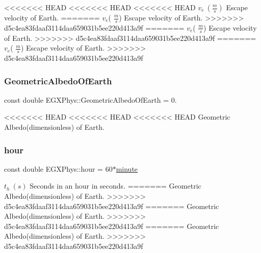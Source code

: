<<<<<<< HEAD
<<<<<<< HEAD
<<<<<<< HEAD
$v_e\ (\frac{m}{s})$ Escape velocity of Earth. \mbox{\label{namespace_e_g_x_phys_aae01fb8ed365fc5de7acebeef34b7351}} 
=======
$v_e$( $\frac{m}{s}$) Escape velocity of Earth. \mbox{\label{namespace_e_g_x_phys_aae01fb8ed365fc5de7acebeef34b7351}} 
>>>>>>> d5c4ea83fdaaf3114daa659031b5ee220d413a9f
=======
$v_e$( $\frac{m}{s}$) Escape velocity of Earth. \mbox{\label{namespace_e_g_x_phys_aae01fb8ed365fc5de7acebeef34b7351}} 
>>>>>>> d5c4ea83fdaaf3114daa659031b5ee220d413a9f
=======
$v_e$( $\frac{m}{s}$) Escape velocity of Earth. \mbox{\label{namespace_e_g_x_phys_aae01fb8ed365fc5de7acebeef34b7351}} 
>>>>>>> d5c4ea83fdaaf3114daa659031b5ee220d413a9f
\subsubsection{\texorpdfstring{Geometric\+Albedo\+Of\+Earth}{GeometricAlbedoOfEarth}}
{\footnotesize\ttfamily const double E\+G\+X\+Phys\+::\+Geometric\+Albedo\+Of\+Earth = 0.}

<<<<<<< HEAD
<<<<<<< HEAD
<<<<<<< HEAD
Geometric Albedo(dimensionless) of Earth. \mbox{\label{namespace_e_g_x_phys_a85c64ea70cddbb7e4c96adcc01cef6e2}} 
\subsubsection{\texorpdfstring{hour}{hour}}
{\footnotesize\ttfamily const double E\+G\+X\+Phys\+::hour = 60$\ast$\hyperlink{namespace_e_g_x_phys_ab3a72a63e9c502847d0db88a167dc02b}{minute}}

$t_{h}\ (s)$ Seconds in an hour in seconds. \mbox{\label{namespace_e_g_x_phys_ace4a9d8c0b21215536857f4c1087a4e8}} 
=======
Geometric Albedo(dimensionless) of Earth. \mbox{\label{namespace_e_g_x_phys_ace4a9d8c0b21215536857f4c1087a4e8}} 
>>>>>>> d5c4ea83fdaaf3114daa659031b5ee220d413a9f
=======
Geometric Albedo(dimensionless) of Earth. \mbox{\label{namespace_e_g_x_phys_ace4a9d8c0b21215536857f4c1087a4e8}} 
>>>>>>> d5c4ea83fdaaf3114daa659031b5ee220d413a9f
=======
Geometric Albedo(dimensionless) of Earth. \mbox{\label{namespace_e_g_x_phys_ace4a9d8c0b21215536857f4c1087a4e8}} 
>>>>>>> d5c4ea83fdaaf3114daa659031b5ee220d413a9f

